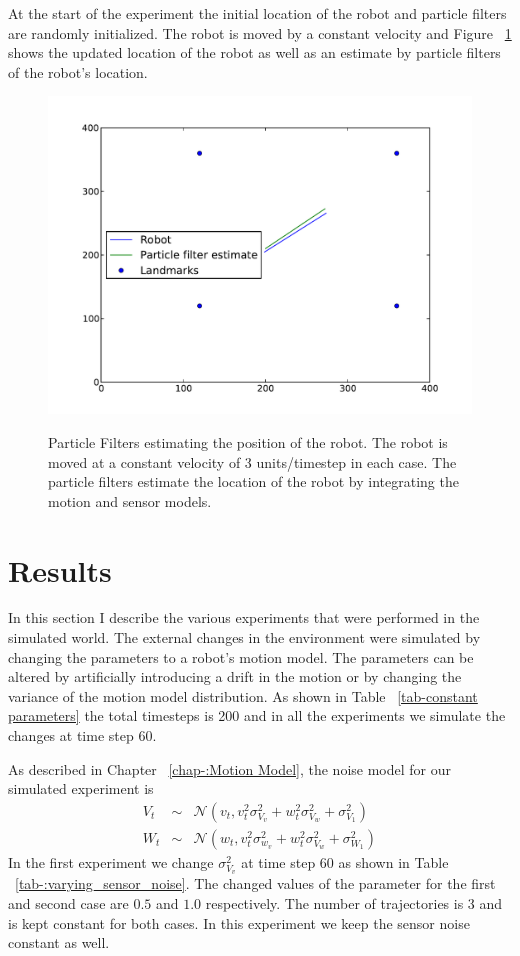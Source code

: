 \documentclass[12pt]{dalcsthesis}
\begin{document}
At the start of the experiment  the initial location of the robot and particle filters are randomly initialized. The robot is moved by a constant velocity and Figure ~\ref{fig-: movement simulation world} shows the updated location of the robot as well as an estimate by particle filters of the robot's location.
\begin{figure}
  \centering
     {\includegraphics[height = 3.0 in]{./plots/world_trajectory.pdf}}
  \caption{\label{fig-: movement simulation world}Particle Filters estimating the position of the robot. The robot is moved at a constant velocity of 3 units/timestep in each case. The particle filters estimate the location of the robot by integrating the motion and sensor models.}
\end{figure}

\section{Results}
In this section I describe the various experiments that were performed in the simulated world. The external changes in the environment were simulated by changing the parameters to a robot's motion model. The parameters can be altered by artificially introducing a drift in the motion or by changing the variance of the motion model distribution. As shown in Table ~\ref{tab-constant parameters} the total timesteps is 200 and in all the experiments we simulate the changes at time step 60. 

As described in Chapter ~\ref{chap-:Motion Model}, the noise model for our simulated experiment is 
\begin{eqnarray*}
V_{t}&\sim&\mathcal{{N}}(v_{t},v_{t}^{2}\sigma_{V_{v}}^{2}+w_{t}^{2}\sigma_{V_{w}}^{2}+\sigma_{V_{1}}^{2}) \\
W_{t}&\sim&\mathcal{{N}}(w_{t},v_{t}^{2}\sigma_{w_{v}}^{2}+w_{t}^{2}\sigma_{V_{w}}^{2}+\sigma_{W_{1}}^{2})
\end{eqnarray*}
In the first experiment we change $\sigma_{V_{v}}^2$ at time step 60 as shown in Table ~\ref{tab-:varying_sensor_noise}. The changed values of the parameter for the first and second case are $0.5$ and $1.0$ respectively. The number of trajectories is 3 and is kept constant for both cases. In this experiment we keep the sensor noise constant as well. 
\end{document}
